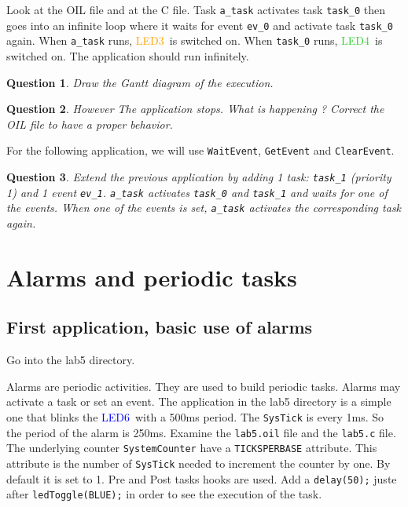 \documentclass[11pt]{article}
\newtheorem{ex}{Question}
\newcommand{\LEDorange}{\textcolor{orange}{LED3}}
\newcommand{\LEDgreen}{\textcolor{LimeGreen}{LED4}}
\newcommand{\LEDblue}{\textcolor{blue}{LED6}}
\begin{document}
Look at the OIL file and at the C file. Task \lstinline{a_task} activates task \lstinline{task_0} then goes into an infinite loop where it waits for event \lstinline{ev_0} and activate task \lstinline{task_0} again. When \lstinline{a_task} runs, \LEDorange\ is switched on. When \lstinline{task_0} runs, \LEDgreen\ is switched on. The application should run infinitely. 

\begin{ex}
Draw the Gantt diagram of the execution.
\end{ex}

\begin{ex}
However The application stops. What is happening ? Correct the OIL file to have a proper behavior.
\end{ex}

For the following application, we will use \lstinline{WaitEvent}, \lstinline{GetEvent} and \lstinline{ClearEvent}.
\begin{ex}
Extend the previous application by adding 1 task: \texttt{task_1} (priority 1) and 1 event \texttt{ev_1}. \texttt{a_task} activates \texttt{task_0} and \texttt{task_1} and waits for one of the events. When one of the events is set, \texttt{a_task} activates the corresponding task again.
\end{ex}

\section{Alarms and periodic tasks}

\subsection{First application, basic use of alarms}

Go into the lab5 directory.

Alarms are periodic activities. They are used to build periodic tasks. Alarms may activate a task or set an event. The application in the lab5 directory is a simple one that blinks the \LEDblue\ with a 500ms period. The \lstinline{SysTick} is every 1ms. So the period of the alarm is 250ms. Examine the \lstinline{lab5.oil} file and the \lstinline{lab5.c} file. The underlying counter \lstinline{SystemCounter} have a \lstinline{TICKSPERBASE} attribute. This attribute is the number of \lstinline{SysTick} needed to increment the counter by one. By default it is set to 1. Pre and Post tasks hooks are used. Add a \lstinline{delay(50);} juste after \lstinline{ledToggle(BLUE);} in order to see the execution of the task.
\end{document}
